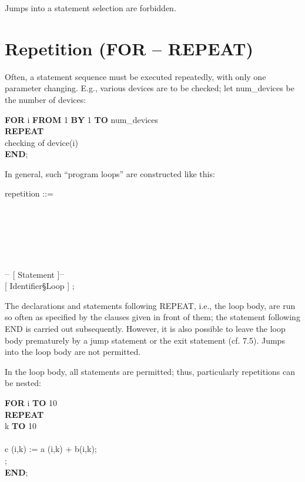 Jumps into a statement selection are forbidden.

\section{Repetition (FOR -- REPEAT)}   %

Often, a statement sequence must be executed repeatedly, with only one
parameter changing. E.g., various devices are to be checked; let
num\_devices be the number of devices:

{\bf FOR} i {\bf FROM} 1 {\bf BY} 1 {\bf TO} num\_devices\\
{\bf REPEAT}\\
\x checking of device(i)\\
{\bf END};

In general, such ``program loops'' are constructed like this:

\begin{front}
repetition ::= \\
 \\
 \\
 \\
 \\
 \\
 \\
\x [ Declaration ]$^{...}$ [ Statement ]$^{...}$ \\
 [ Identifier\S Loop ] ;
\end{front}
\begin{grammar}

\end{grammar}
The declarations and statements following REPEAT, i.e., the loop body,
are run so often as specified by the clauses given in front of them; the
statement following END is carried out subsequently. However, it is also
possible to leave the loop body prematurely by a jump statement or the
exit statement (cf. 7.5). Jumps into the loop body are not permitted.

In the loop body, all statements are permitted; thus, particularly
repetitions can be nested:

{\bf FOR} i {\bf TO} 10\\
{\bf REPEAT} \\
 k {\bf TO} 10 \\
 \\
\x \x c (i,k) := a (i,k) + b(i,k);\\
;\\
{\bf END};


